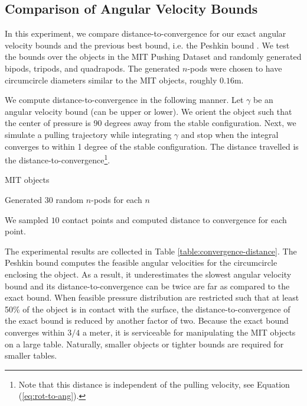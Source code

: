 \documentclass[conference]{IEEEtran}
\begin{document}
\subsection{Comparison of
  Angular Velocity Bounds}\label{sec:bound-comparison}
In this experiment, we compare distance-to-convergence for our exact
angular velocity bounds and the previous best bound, i.e. the Peshkin
bound \cite{peshkin1988motion}. We test the bounds over the objects in
the MIT Pushing Dataset \cite{} and randomly generated bipods,
tripods, and quadrapods. The generated $n$-pods were chosen to have
circumcircle diameters similar to the MIT objects, roughly
$0.16$m. 

We compute distance-to-convergence in the following manner. Let
$\gamma$ be an angular velocity bound (can be upper or lower). We
orient the object such that the center of pressure is 90 degrees away
from the stable configuration. Next, we simulate a pulling trajectory
while integrating $\gamma$ and stop when the integral converges to
within 1 degree of the stable configuration. The distance travelled is
the distance-to-convergence\footnote{Note that this distance is
  independent of the pulling velocity, see Equation
  (\ref{eq:rot-to-ang}).}.

\begin{inparaenum}
\item MIT objects
\item Generated 30 random $n$-pods for each $n$
\item We sampled $10$ contact points and computed distance to
  convergence for each point.
\end{inparaenum}

The experimental results are collected in Table
\ref{table:convergence-distance}. 
The Peshkin bound computes the feasible angular velocities for the
circumcircle enclosing the object. As a result, it underestimates the
slowest angular velocity bound and its distance-to-convergence can be
twice are far as compared to the exact bound.  When feasible pressure
distribution are restricted such that at least 50\% of the object is
in contact with the surface, the distance-to-convergence of the exact
bound is reduced by another factor of two. Because the exact bound
converges within $3/4$ a meter, it is serviceable for manipulating the
MIT objects on a large table. Naturally, smaller objects or tighter
bounds are required for smaller tables.
\end{document}
